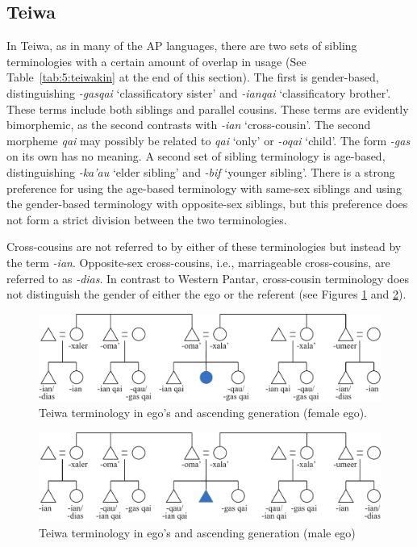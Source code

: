 \subsection{Teiwa}\label{sect_teiwa}
\label{bkm:Ref247777020}In Teiwa, as in many of the AP languages, there are two sets of sibling terminologies with a certain amount of overlap in usage (See Table~\ref{tab:5:teiwakin} at the end of this section). The first is gender-based, distinguishing \textit{-gasqai} `classificatory sister' and \textit{-ianqai} `classificatory brother'. These terms include both siblings and parallel cousins. These terms are evidently bimorphemic, as the second contrasts with \textit{-ian} `cross-cousin'. The second morpheme \textit{qai} may possibly be related to \textit{qai} `only' or \textit{-oqai} `child'. The form \textit{-gas} on its own has no meaning. A second set of sibling terminology is age-based, distinguishing \textit{-ka'au} `elder sibling' and \textit{-bif}  `younger sibling'. There is a strong preference for using the age-based terminology with same-sex siblings and using the gender-based terminology with opposite-sex siblings, but this preference does not form a strict division between the two terminologies. 

Cross-cousins are not referred to by either of these terminologies but instead by the term \textit{-ian}. Opposite-sex cross-cousins, i.e., marriageable cross-cousins, are referred to as  \textit{-dias}. In contrast to Western Pantar, cross-cousin terminology does not distinguish the gender of either the ego or the referent (see Figures \ref{fig:5:5} and \ref{fig:5:6}).

\begin{figure}[h]
\includegraphics[width=\textwidth]{figures/Holton_ch5_fig5.pdf}
\caption{Teiwa terminology in ego's and ascending generation (female ego). }
\label{fig:5:5}
\end{figure}   

\begin{figure}[b]
\includegraphics[width=\textwidth]{figures/Holton_ch5_fig6.pdf}
\caption{Teiwa terminology in ego's and ascending generation (male ego) }
\label{fig:5:6}
\end{figure}  
 

